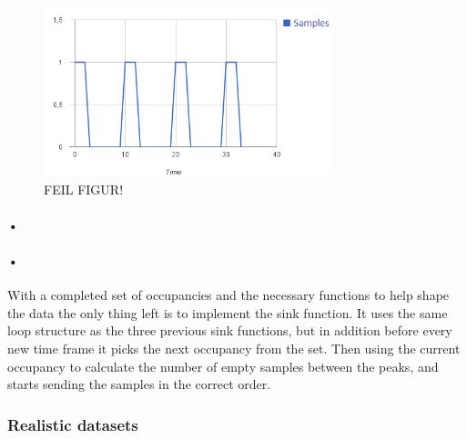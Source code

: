 \documentclass[a4paper, 12pt]{report}
\begin{document}
\begin{figure}[h!]
	\centering
		\includegraphics[width=0.75\textwidth]{images/normal-data-shape.png}
		\caption{FEIL FIGUR!}
		\label{fig:normal-data-shape}
\end{figure}

\paragraph{•}
\begin{minipage}{\linewidth}

\end{minipage}

\paragraph{•}
With a completed set of occupancies and the necessary functions to help shape the data the only thing left is to implement the sink function.
It uses the same loop structure as the three previous sink functions, but in addition before every new time frame it picks the next occupancy from the set.
Then using the current occupancy to calculate the number of empty samples between the peaks, and starts sending the samples in the correct order.

\subsubsection{Realistic datasets}
\label{subsubsec:real-data}
\end{document}
